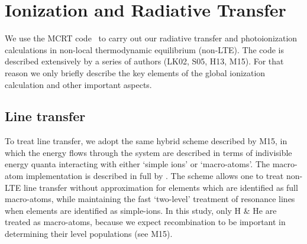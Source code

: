\documentclass[useAMS,usenatbib]{mn2e_x}
\begin{document}











\section{Ionization and Radiative Transfer}

We use the MCRT code \py\ to carry out our radiative transfer and photoionization
calculations in non-local thermodynamic equilibrium (non-LTE). 
The code is described extensively by a series of authors (LK02, S05, H13, M15).
For that reason we only briefly describe the key elements of the global 
ionization calculation and other important aspects.

\subsection{Line transfer}

To treat line transfer, we adopt the same hybrid scheme 
described by M15, 
in which the energy flows
through the system are described in terms of indivisible
energy quanta interacting with either `simple ions'
or `macro-atoms'. The macro-atom implementation 
is described in full by \cite{lucy2002, lucy2003}.
The scheme allows one to treat non-LTE line transfer without
approximation for elements which are identified as 
full macro-atoms, while maintaining the fast `two-level' 
treatment of resonance lines when elements are identified 
as simple-ions. In this study,
only H \& He are treated as macro-atoms, because 
we expect recombination to be important
in determining their level populations (see M15).
\end{document}
